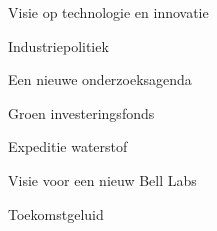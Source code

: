 
\begin{visie-concept}{Visie op technologie en innovatie}\end{visie-concept}

\begin{voorstel-concept}{Industriepolitiek}\end{voorstel-concept}
\begin{voorstel-concept}{Een nieuwe onderzoeksagenda}\end{voorstel-concept}
\begin{voorstel-concept}{Groen investeringsfonds}\end{voorstel-concept}
\begin{voorstel-concept}{Expeditie waterstof}\end{voorstel-concept}
\begin{voorstel-concept}{Visie voor een nieuw Bell Labs}\end{voorstel-concept}
\begin{voorstel-concept}{Toekomstgeluid}\end{voorstel-concept}
